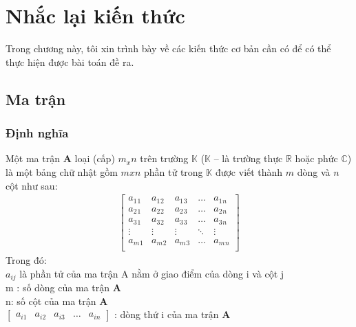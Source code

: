 
\chapter{Nhắc lại kiến thức}

\everymath{\displaystyle}

\label{chap:chap2}
Trong chương này, tôi xin trình bày về các kiến thức cơ bản cần có để có thể thực hiện được bài toán đề ra.
\section{Ma trận}
\subsection{Định nghĩa}
Một ma trận \textbf{A} loại (cấp) $m_x n$ trên trường $\mathbb{K}$ ($\mathbb{K}$ – là trường thực $\mathbb{R}$ hoặc phức $\mathbb{C}$) là một bảng chữ nhật gồm $m x n$ phần tử trong $\mathbb{K}$ được viết thành $m$ dòng và $n$ cột như sau:
\begin{align*}
	\begin{bmatrix}
		a_1{}_1 & a_1{}_2 & a_1{}_3  &\ldots& a_1{}_n \\
		a_2{}_1 & a_2{}_2 & a_2{}_3  & \ldots & a_2{}_n \\
		a_3{}_1 & a_3{}_2 & a_3{}_3  & \ldots & a_3{}_n \\
		\vdots & \vdots& \vdots  & \ddots& \vdots\\			
		a_m{}_1 & a_m{}_2 & a_m{}_3 &\ldots& a_m{}_n \\
	\end{bmatrix}	
\end{align*}
Trong đó: \\ 

	\hspace{5mm} $a_{ij}$ là phần tử của ma trận A nằm ở giao điểm của dòng i và cột j\\
	
	\hspace{5mm} m : số dòng của ma trận \textbf{A}\\
	
	\hspace{5mm} n: số cột của ma trận \textbf{A}\\
	
	\hspace{5mm} 
$	\begin{bmatrix}
		a_{i1} & a_{i2}& a_{i3}&\ldots& a_{in}			
	\end{bmatrix}$ : 
	dòng thứ i của ma trận \textbf{A}\\
	
